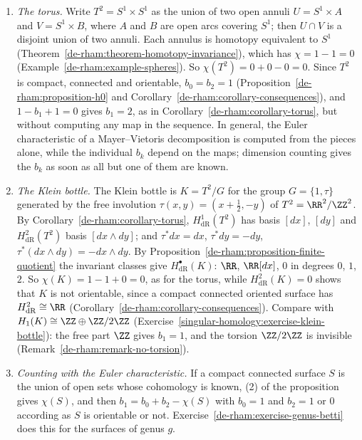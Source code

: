 \begin{example}\label{de-rham:example-dimension-counting}
\begin{enumerate}
\item \emph{The torus.} Write $T^2 = S^1 \times S^1$ as the union of two open annuli $U = S^1 \times A$ and $V = S^1 \times B$, where $A$ and $B$ are open arcs covering $S^1$; then $U \cap V$ is a disjoint union of two annuli. Each annulus is
homotopy equivalent to $S^1$ (Theorem~\ref{de-rham:theorem-homotopy-invariance}), which has $\chi = 1 - 1 = 0$ (Example~\ref{de-rham:example-spheres}). So $\chi(T^2) = 0 + 0 - 0 = 0$. Since $T^2$ is compact, connected and orientable, $b_0 = b_2 = 1$ (Proposition~\ref{de-rham:proposition-h0} and
Corollary~\ref{de-rham:corollary-consequences}), and $1 - b_1 + 1 = 0$ gives $b_1 = 2$, as in Corollary~\ref{de-rham:corollary-torus}, but without computing any map in the sequence. In general, the
Euler characteristic of a Mayer--Vietoris decomposition is computed from the pieces alone, while the individual $b_k$ depend on the maps; dimension counting gives the $b_k$ as soon as all but one of them are known.
\item \emph{The Klein bottle.} The Klein bottle is $K = T^2/G$ for the group $G = \{1, \tau\}$ generated by the free involution $\tau(x, y) = (x + \frac12, -y)$ of $T^2 = \RR^2/\ZZ^2$. By Corollary~\ref{de-rham:corollary-torus},
$H^1_{\mathrm{dR}}(T^2)$ has basis $[dx]$, $[dy]$ and $H^2_{\mathrm{dR}}(T^2)$ basis $[dx \wedge dy]$; and $\tau^*dx = dx$, $\tau^*dy = -dy$, $\tau^*(dx \wedge dy) = -dx \wedge dy$. By
Proposition~\ref{de-rham:proposition-finite-quotient} the invariant classes give $H^\bullet_{\mathrm{dR}}(K)$: $\RR$, $\RR[dx]$, $0$ in degrees $0$, $1$, $2$. So $\chi(K) = 1 - 1 + 0 = 0$, as for the torus, while
$H^2_{\mathrm{dR}}(K) = 0$ shows that $K$ is not orientable, since a compact connected oriented surface has $H^2_{\mathrm{dR}} \cong \RR$ (Corollary~\ref{de-rham:corollary-consequences}). Compare with
$H_1(K) \cong \ZZ \oplus \ZZ/2\ZZ$ (Exercise~\ref{singular-homology:exercise-klein-bottle}): the free part $\ZZ$ gives $b_1 = 1$, and the torsion $\ZZ/2\ZZ$ is invisible (Remark~\ref{de-rham:remark-no-torsion}).
\item \emph{Counting with the Euler characteristic.} If a compact connected surface $S$ is the union of open sets whose cohomology is known, (2) of the proposition gives $\chi(S)$, and then
$b_1 = b_0 + b_2 - \chi(S)$ with $b_0 = 1$ and $b_2 = 1$ or $0$ according as $S$ is orientable or not. Exercise~\ref{de-rham:exercise-genus-betti} does this for the surfaces of genus $g$.
\end{enumerate}
\end{example}

